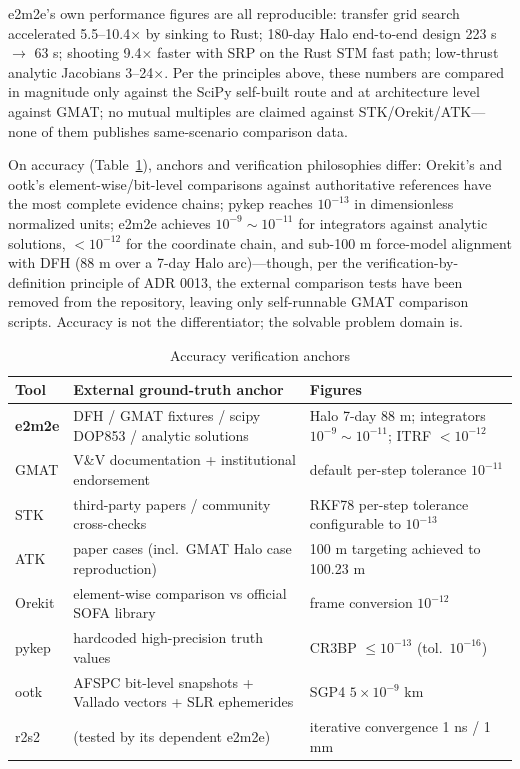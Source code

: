 e2m2e's own performance figures are all reproducible: transfer grid search
accelerated 5.5--10.4$\times$ by sinking to Rust; 180-day Halo end-to-end
design 223 s $\to$ 63 s; shooting 9.4$\times$ faster with SRP on the Rust
STM fast path; low-thrust analytic Jacobians 3--24$\times$. Per the
principles above, these numbers are compared in magnitude only against the
SciPy self-built route and at architecture level against GMAT; no mutual
multiples are claimed against STK/Orekit/ATK---none of them publishes
same-scenario comparison data.

On accuracy (Table~\ref{tab:prec}), anchors and verification philosophies
differ: Orekit's and ootk's element-wise/bit-level comparisons against
authoritative references have the most complete evidence chains; pykep
reaches $10^{-13}$ in dimensionless normalized units; e2m2e achieves
$10^{-9}\sim10^{-11}$ for integrators against analytic solutions,
$<10^{-12}$ for the coordinate chain, and sub-100 m force-model alignment
with DFH (88 m over a 7-day Halo arc)---though, per the
verification-by-definition principle of ADR 0013, the external comparison
tests have been removed from the repository, leaving only self-runnable
GMAT comparison scripts. Accuracy is not the differentiator; the solvable
problem domain is.

\begin{table}[htbp]
\centering\small
\caption{Accuracy verification anchors}
\label{tab:prec}
\begin{tabularx}{\textwidth}{@{}lXl@{}}
\toprule
\textbf{Tool} & \textbf{External ground-truth anchor} & \textbf{Figures} \\
\midrule
\textbf{e2m2e} & DFH / GMAT fixtures / scipy DOP853 / analytic solutions &
Halo 7-day 88 m; integrators $10^{-9}\sim10^{-11}$; ITRF $<10^{-12}$ \\
GMAT & V\&V documentation + institutional endorsement & default per-step
tolerance $10^{-11}$ \\
STK & third-party papers / community cross-checks & RKF78 per-step tolerance
configurable to $10^{-13}$ \\
ATK & paper cases (incl.\ GMAT Halo case reproduction) & 100 m targeting
achieved to 100.23 m \\
Orekit & element-wise comparison vs official SOFA library & frame conversion
$10^{-12}$ \\
pykep & hardcoded high-precision truth values & CR3BP $\le 10^{-13}$
(tol.\ $10^{-16}$) \\
ootk & AFSPC bit-level snapshots + Vallado vectors + SLR ephemerides & SGP4
$5\times10^{-9}$ km \\
r2s2 & (tested by its dependent e2m2e) & iterative convergence 1 ns / 1 mm \\
\bottomrule
\end{tabularx}
\end{table}

